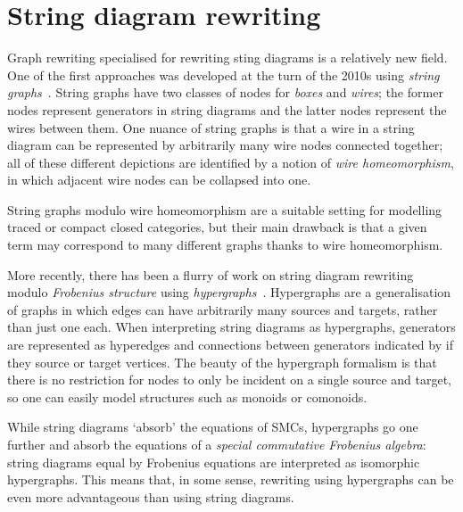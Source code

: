 \section{String diagram rewriting}

Graph rewriting specialised for rewriting sting diagrams is a
relatively new field.
One of the first approaches was developed at the turn of the 2010s using
\emph{string graphs}~\cite{%
    dixon2010open,dixon2013opengraphs,kissinger2012pictures%
}.
String graphs have two classes of nodes for \emph{boxes} and \emph{wires}; the
former nodes represent generators in string diagrams and the latter nodes
represent the wires between them.
One nuance of string graphs is that a wire in a string diagram can be
represented by arbitrarily many wire nodes connected together; all of these
different depictions are identified by a notion of \emph{wire homeomorphism}, in
which adjacent wire nodes can be collapsed into one.

\begin{center}
\end{center}

String graphs modulo wire homeomorphism are a suitable setting for modelling
traced or compact closed categories, but their main drawback is that a given
term may correspond to many different graphs thanks to wire homeomorphism.

More recently, there has been a flurry of work on string
diagram rewriting modulo \emph{Frobenius structure} using
\emph{hypergraphs}~\cite{%
    bonchi2016rewriting,zanasi2017rewriting,bonchi2017confluence,%
    bonchi2018rewriting,bonchi2022string,bonchi2022stringa,bonchi2022stringb%
}.
Hypergraphs are a generalisation of graphs in which edges can have arbitrarily
many sources and targets, rather than just one each.
When interpreting string diagrams as hypergraphs, generators are represented as
hyperedges and connections between generators indicated by if they source or
target vertices.
The beauty of the hypergraph formalism is that there is no restriction for
nodes to only be incident on a single source and target, so one can easily
model structures such as monoids or comonoids.

\begin{center}
\end{center}

While string diagrams `absorb' the equations of SMCs, hypergraphs go one further
and absorb the equations of
a \emph{special commutative Frobenius algebra}: string diagrams
equal by Frobenius equations are interpreted as isomorphic hypergraphs.
This means that, in some sense, rewriting using hypergraphs can be even more
advantageous than using string diagrams.

